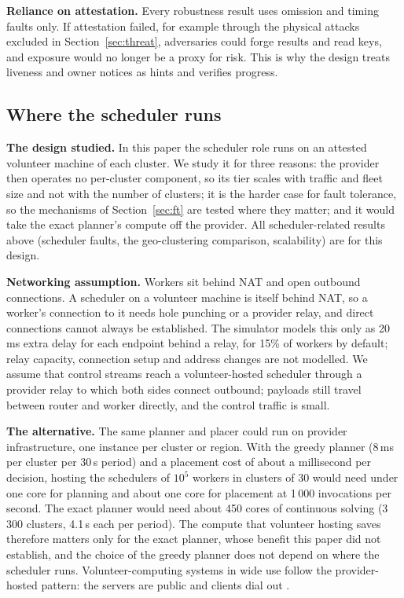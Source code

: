 \textbf{Reliance on attestation.} Every robustness result uses omission and timing faults only. If attestation failed, for example through the physical attacks excluded in Section~\ref{sec:threat}, adversaries could forge results and read keys, and exposure would no longer be a proxy for risk. This is why the design treats liveness
and owner notices as hints and verifies progress.

\subsection{Where the scheduler runs}
\label{sec:schedplace}
\textbf{The design studied.} In this paper the scheduler role runs on an attested volunteer machine of each cluster. We study it for three reasons: the provider then operates no per-cluster component, so its tier scales with traffic and fleet size and not with the number of clusters; it is the harder case for fault tolerance, so the mechanisms of Section~\ref{sec:ft} are tested where they matter; and it would take the exact planner's compute off the provider. All scheduler-related results above (scheduler faults, the geo-clustering comparison, scalability) are for this design.

\textbf{Networking assumption.} Workers sit behind NAT and open outbound connections. A scheduler on a volunteer machine is itself behind NAT, so a worker's connection to it needs hole punching or a provider relay, and direct connections cannot always be established. The simulator models this only as 20\,ms extra delay for each endpoint behind a relay, for 15\% of workers by default; relay capacity, connection setup and address changes are not modelled. We assume that control streams reach a volunteer-hosted scheduler through a provider relay to which both sides connect outbound; payloads still travel between router and worker directly, and the control traffic is small.

\textbf{The alternative.} The same planner and placer could run on provider infrastructure, one instance per cluster or region. With the greedy planner (8\,ms per cluster per 30\,s period) and a placement cost of about a millisecond per decision, hosting the schedulers of $10^5$ workers in clusters of 30 would need under one core for planning and about one core for placement at 1\,000 invocations per second. The exact planner would need about 450 cores of continuous solving (3\,300 clusters, 4.1\,s each per period). The compute that volunteer hosting saves therefore matters only for the exact planner, whose benefit this paper did not establish, and the choice of the greedy planner does not depend on where the scheduler runs. Volunteer-computing systems in wide use follow the provider-hosted pattern: the servers are public and clients dial out \cite{anderson2004boinc}.

